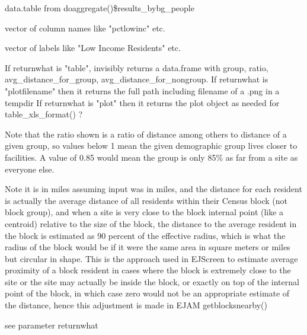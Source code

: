 \documentclass[a4paper]{book}
\begin{document}
\begin{Arguments}
\begin{ldescription}
\item[\code{results\_bybg\_people}] data.table from doaggregate()\$results\_bybg\_people

\item[\code{demogvarname}] vector of column names like "pctlowinc" etc.

\item[\code{demoglabel}] vector of labels like "Low Income Residents" etc.

\item[\code{returnwhat}] If returnwhat is "table", invisibly returns a
data.frame with group, ratio, avg\_distance\_for\_group, avg\_distance\_for\_nongroup.
If returnwhat is "plotfilename" then it returns the full path including filename of a .png in a tempdir
If returnwhat is "plot" then it returns the plot object as needed for table\_xls\_format() ?
\end{ldescription}
\end{Arguments}
%
\begin{Details}\relax
Note that the ratio shown is a ratio of distance among others to distance of a given group,
so values below 1 mean the given demographic group lives closer to facilities.
A value of 0.85 would mean the group is only 85\% as far from a site as everyone else.

Note it is in miles assuming input was in miles, and the distance for each resident is
actually the average distance of all residents within their Census block (not block group),
and when a site is very close to the block internal point (like a centroid)
relative to the size of the block, the distance to the average resident in the block is
estimated as 90 percent of the effective radius, which is what the radius of the block
would be if it were the same area in square meters or miles but circular in shape.
This is the approach used in EJScreen to estimate average proximity of a block resident in
cases where the block is extremely close to the site or the site may actually be inside the block,
or exactly on top of the internal point of the block, in which case zero would not be an
appropriate estimate of the distance, hence this adjustment is made in EJAM getblocksnearby()
\end{Details}
%
\begin{Value}
see parameter returnwhat
\end{Value}
%
\begin{SeeAlso}\relax
{}

  
\end{SeeAlso}
\end{document}
